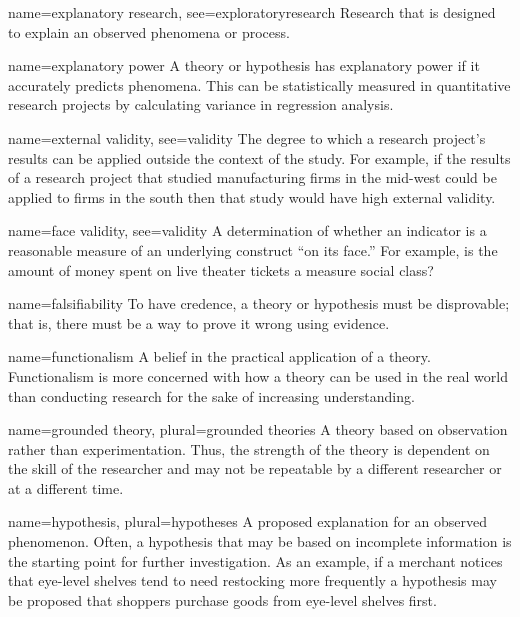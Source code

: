 {name={explanatory research},
	see={exploratoryresearch}}
{%
	Research that is designed to explain an observed phenomena or process. 
}

{name={explanatory power}}
{%
	A theory or hypothesis has explanatory power if it accurately predicts phenomena. This can be statistically measured in quantitative research projects by calculating variance in regression analysis.
}


{name={external validity},
	see={validity}}
{%
	The degree to which a research project's results can be applied outside the context of the study. For example, if the results of a research project that studied manufacturing firms in the mid-west could be applied to firms in the south then that study would have high external validity.
}

{name={face validity},
	see={validity}}
{%
	A determination of whether an indicator is a reasonable measure of an underlying construct ``on its face.'' For example, is the amount of money spent on live theater tickets a measure social class?
}

{name={falsifiability}}
{%
	To have credence, a theory or hypothesis must be disprovable; that is, there must be a way to prove it wrong using evidence.
}

{name={functionalism}}
{%
	A belief in the practical application of a theory. Functionalism is more concerned with how a theory can be used in the real world than conducting	research for the sake of increasing understanding. 
}

{name={grounded theory},
	plural={grounded theories}}
{%
	A theory based on observation rather than experimentation. Thus, the strength of the theory is dependent on the skill of the researcher and may not be repeatable by a different researcher or at a different time.
}

{name={hypothesis},
	plural={hypotheses}}
{%
	A proposed explanation for an observed phenomenon. Often, a hypothesis that may be based on incomplete information is the starting point for further investigation. As an example, if a merchant notices that eye-level shelves tend to need restocking more frequently a hypothesis may be proposed that shoppers purchase goods from eye-level shelves first. 
}

